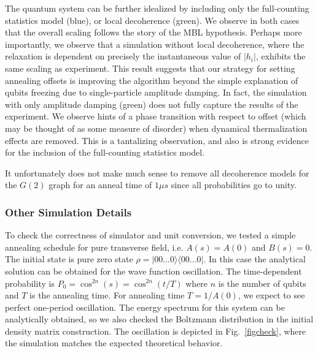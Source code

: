 \documentclass[prd,twocolumn,tightenlines,preprintnumbers,showpacs,superscriptaddress,notitlepage,nofootinbib,eqsecnum,floatfix,longbibliography,aps,10pt]{revtex4-2}
\begin{document}
The quantum system can be further idealized by including only the full-counting statistics model (blue), or local decoherence (green). We observe in both cases that the overall scaling follows the story of the MBL hypothesis. Perhaps more importantly, we observe that a simulation without local decoherence, where the relaxation is dependent on precisely the instantaneous value of $|h_i|$, exhibits the same scaling as experiment. This result suggests that our strategy for setting annealing offsets is improving the algorithm beyond the simple explanation of qubits freezing due to single-particle amplitude damping. In fact, the simulation with only amplitude damping (green) does not fully capture the results of the experiment. We observe hints of a phase transition with respect to offset (which may be thought of as some measure of disorder) when dynamical thermalization effects are removed. This is a tantalizing observation, and also is strong evidence for the inclusion of the full-counting statistics model.

It unfortunately does not make much sense to remove all decoherence models for the $G(2)$ graph for an anneal time of $1\mu s$ since all probabilities go to unity.

\subsubsection{Other Simulation Details}
\label{sec:methods:simulation_details}
To check the correctness of simulator and unit conversion, we tested a simple annealing schedule for pure transverse field, i.e. $A(s)=A(0)$ and $B(s)=0$.
The initial state is pure zero state $\rho=|00...0\rangle \langle 00...0|$.
In this case the analytical solution can be obtained for the wave function oscillation.
The time-dependent probability is $P_{0}=\cos^{2n}(s)=\cos^{2n}(t/T)$ where $n$ is the number of qubits and $T$ is the annealing time.
For annealing time $T=1/A(0)$, we expect to see perfect one-period oscillation. The energy spectrum for this system can be analytically obtained, so we also checked the Boltzmann distribution in the initial density matrix construction. The oscillation is depicted in Fig.~\ref{figcheck}, where the simulation matches the expected theoretical behavior.
\end{document}
